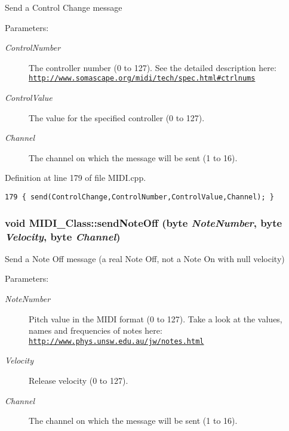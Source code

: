 Send a Control Change message \begin{Desc}
\item[Parameters:]
\begin{description}
\item[{\em ControlNumber}]The controller number (0 to 127). See the detailed description here: \href{http://www.somascape.org/midi/tech/spec.html#ctrlnums}{\tt http://www.somascape.org/midi/tech/spec.html\#ctrlnums} \item[{\em ControlValue}]The value for the specified controller (0 to 127). \item[{\em Channel}]The channel on which the message will be sent (1 to 16). \end{description}
\end{Desc}


Definition at line 179 of file MIDI.cpp.

\begin{Code}\begin{verbatim}179 { send(ControlChange,ControlNumber,ControlValue,Channel); }
\end{verbatim}
\end{Code}


\hypertarget{class_m_i_d_i___class_381e1e8019aae5f872279cda496f964c}{
\subsubsection[{sendNoteOff}]{\setlength{\rightskip}{0pt plus 5cm}void MIDI\_\-Class::sendNoteOff ({\bf byte} {\em NoteNumber}, \/  {\bf byte} {\em Velocity}, \/  {\bf byte} {\em Channel})}}
\label{class_m_i_d_i___class_381e1e8019aae5f872279cda496f964c}


Send a Note Off message (a real Note Off, not a Note On with null velocity) \begin{Desc}
\item[Parameters:]
\begin{description}
\item[{\em NoteNumber}]Pitch value in the MIDI format (0 to 127). Take a look at the values, names and frequencies of notes here: \href{http://www.phys.unsw.edu.au/jw/notes.html}{\tt http://www.phys.unsw.edu.au/jw/notes.html}\par
 \item[{\em Velocity}]Release velocity (0 to 127). \item[{\em Channel}]The channel on which the message will be sent (1 to 16). \end{description}
\end{Desc}


